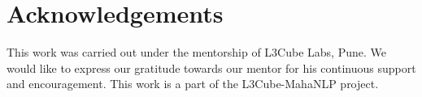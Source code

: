 \documentclass[11pt]{article}
\begin{document}
\section*{Acknowledgements}
This work was carried out under the mentorship of L3Cube Labs, Pune. We would like to express our gratitude towards our mentor for his continuous support and encouragement. This work is a part of the L3Cube-MahaNLP project\cite{joshi2022l3cube_mahanlp}.

\nocite{*}

\end{document}
